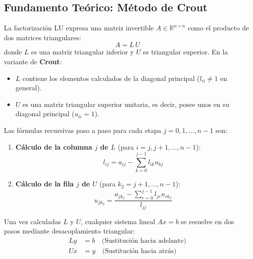 \documentclass[11pt,a4paper]{article}
\theoremstyle{definition}
\theoremstyle{remark}
\begin{document}
\subsection{Fundamento Teórico: Método de Crout}
La factorización LU expresa una matriz invertible $A \in \mathbb{R}^{n \times n}$ como el producto de dos matrices triangulares:
\begin{equation}
    A = L \, U
\end{equation}
donde $L$ es una matriz triangular inferior y $U$ es triangular superior. En la variante de \textbf{Crout}:
\begin{itemize}[leftmargin=*]
    \item $L$ contiene los elementos calculados de la diagonal principal ($l_{ii} \neq 1$ en general).
    \item $U$ es una matriz triangular superior unitaria, es decir, posee unos en su diagonal principal ($u_{ii} = 1$).
\end{itemize}

Las fórmulas recursivas paso a paso para cada etapa $j = 0, 1, \dots, n-1$ son:
\begin{enumerate}
    \item \textbf{Cálculo de la columna $j$ de $L$} (para $i = j, j+1, \dots, n-1$):
    \begin{equation}
        l_{ij} = a_{ij} - \sum_{k=0}^{j-1} l_{ik} u_{kj}
    \end{equation}
    \item \textbf{Cálculo de la fila $j$ de $U$} (para $k_2 = j+1, \dots, n-1$):
    \begin{equation}
        u_{j k_2} = \frac{a_{j k_2} - \sum_{r=0}^{j-1} l_{jr} u_{r k_2}}{l_{jj}}
    \end{equation}
\end{enumerate}

Una vez calculadas $L$ y $U$, cualquier sistema lineal $Ax = b$ se resuelve en dos pasos mediante desacoplamiento triangular:
\begin{align}
    L y &= b \quad \text{(Sustitución hacia adelante)} \\
    U x &= y \quad \text{(Sustitución hacia atrás)}
\end{align}
\end{document}

